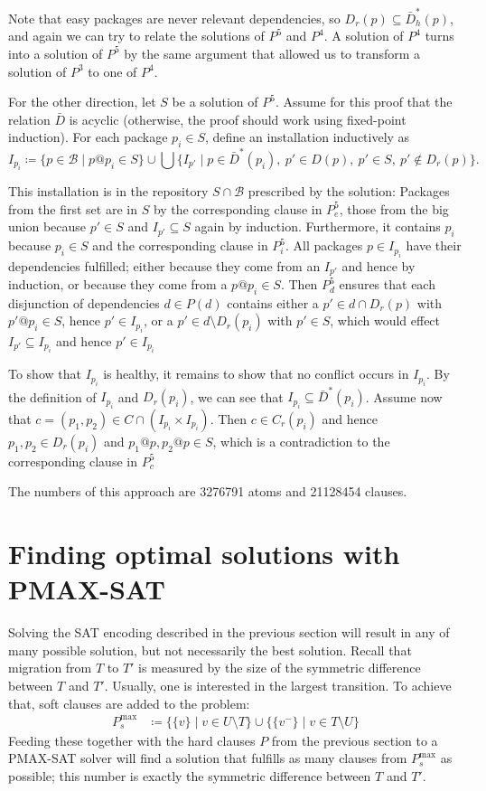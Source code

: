 \documentclass[halfparskip,11pt]{scrartcl}
\begin{document}
Note that easy packages are never relevant dependencies, so $D_r(p) \subseteq \bar D_h^*(p)$, and again we can try to relate the solutions of $P^5$ and $P^4$. A solution of $P^4$ turns into a solution of $P^5$ by the same argument that allowed us to transform a solution of $P^3$ to one of $P^4$. 

For the other direction, let $S$ be a solution of $P^5$. Assume for this proof that the relation $\bar D$ is acyclic (otherwise, the proof should work using fixed-point induction). For each package $p_i\in S$, define an installation inductively as
\[
I_{p_i} \coloneqq \{ p \in \mathcal B \mid p@p_i \in S \} \cup 
\bigcup \{ I_{p'} \mid p\in \bar D^*(p_i),\ p' \in D(p),\ p'\in S,\ p'\notin D_r(p)\}.
\]

This installation is in the repository $S\cap \mathcal B$ prescribed by the solution: Packages from the first set are in $S$ by the corresponding clause in $P^5_e$, those from the big union because $p'\in S$ and $I_{p'}\subseteq S$ again by induction. Furthermore, it contains $p_i$ because $p_i\in S$ and the corresponding clause in $P^5_i$. All packages $p\in I_{p_i}$ have their dependencies fulfilled; either because they come from an $I_{p'}$ and hence by induction, or because they come from a $p@p_i\in S$. Then $P^5_d$ ensures that each disjunction of dependencies $d\in P(d)$ contains either a $p'\in d\cap D_r(p)$ with $p'@p_i\in S$, hence $p'\in I_{p_i}$, or a $p' \in d\setminus D_r(p_i)$ with $p' \in S$, which would effect $I_{p'}\subseteq I_{p_i}$ and hence $p'\in I_{p_i}$

To show that $I_{p_i}$ is healthy, it remains to show that no conflict occurs in $I_{p_i}$. By the definition of $I_{p_i}$ and $D_r(p_i)$, we can see that $I_{p_i} \subseteq \bar D^*(p_i)$. Assume now that $c = (p_1,p_2) \in C\cap (I_{p_i}\times I_{p_i})$. Then $c \in C_r(p_i)$ and hence $p_1,p_2 \in D_r(p_i)$ and $p_1@p, p_2@p \in S$, which is a contradiction to the corresponding clause in $P_c^5$

The numbers of this approach are 3276791 atoms and 21128454 clauses.

\section{Finding optimal solutions with PMAX-SAT}

Solving the SAT encoding described in the previous section will result in any of many possible solution, but not necessarily the best solution. Recall that migration from $T$ to $T'$ is measured by the size of the symmetric difference between $T$ and $T'$. Usually, one is interested in the largest transition. To achieve that, soft clauses are added to the problem:
\begin{align*}
P_s^{\text{max}} &\coloneqq \{ \{v\} \mid v \in U\setminus T\} \cup \{ \{v^-\} \mid v \in T\setminus U\}
\end{align*}
Feeding these together with the hard clauses $P$ from the previous section to a PMAX-SAT solver will find a solution that fulfills as many clauses from $P_s^{\text{max}}$ as possible; this number is exactly the symmetric difference between $T$ and $T'$.
\end{document}
